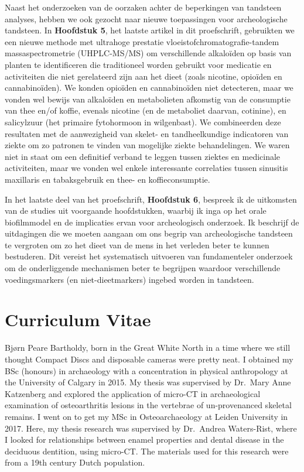 \documentclass[
  b5paper,
]{book}
\begin{document}
Naast het onderzoeken van de oorzaken achter de beperkingen van
tandsteen analyses, hebben we ook gezocht naar nieuwe toepassingen voor
archeologische tandsteen. In \textbf{Hoofdstuk 5}, het laatste artikel
in dit proefschrift, gebruikten we een nieuwe methode met ultrahoge
prestatie vloeistofchromatografie-tandem massaspectrometrie
(UHPLC-MS/MS) om verschillende alkaloïden op basis van planten te
identificeren die traditioneel worden gebruikt voor medicatie en
activiteiten die niet gerelateerd zijn aan het dieet (zoals nicotine,
opioïden en cannabinoïden). We konden opioïden en cannabinoïden niet
detecteren, maar we vonden wel bewijs van alkaloïden en metabolieten
afkomstig van de consumptie van thee en/of koffie, evenals nicotine (en
de metaboliet daarvan, cotinine), en salicylzuur (het primaire
fytohormoon in wilgenbast). We combineerden deze resultaten met de
aanwezigheid van skelet- en tandheelkundige indicatoren van ziekte om zo
patronen te vinden van mogelijke ziekte behandelingen. We waren niet in
staat om een definitief verband te leggen tussen ziektes en medicinale
activiteiten, maar we vonden wel enkele interessante correlaties tussen
sinusitis maxillaris en tabaksgebruik en thee- en koffieconsumptie.

In het laatste deel van het proefschrift, \textbf{Hoofdstuk 6}, bespreek
ik de uitkomsten van de studies uit voorgaande hoofdstukken, waarbij ik
inga op het orale biofilmmodel en de implicaties ervan voor
archeologisch onderzoek. Ik beschrijf de uitdagingen die we moeten
aangaan om ons begrip van archeologische tandsteen te vergroten om zo
het dieet van de mens in het verleden beter te kunnen bestuderen. Dit
vereist het systematisch uitvoeren van fundamenteler onderzoek om de
onderliggende mechanismen beter te begrijpen waardoor verschillende
voedingsmarkers (en niet-dieetmarkers) ingebed worden in tandsteen.

\label{curriculum-vitae}

\chapter*{Curriculum Vitae}


Bjørn Peare Bartholdy, born in the Great White North in a time where we
still thought Compact Discs and disposable cameras were pretty neat. I
obtained my BSc (honours) in archaeology with a concentration in
physical anthropology at the University of Calgary in 2015. My thesis
was supervised by Dr.~Mary Anne Katzenberg and explored the application
of micro-CT in archaeological examination of osteoarthritis lesions in
the vertebrae of un-provenanced skeletal remains. I went on to get my
MSc in Osteoarchaeology at Leiden University in 2017. Here, my thesis
research was supervised by Dr.~Andrea Waters-Rist, where I looked for
relationships between enamel properties and dental disease in the
deciduous dentition, using micro-CT. The materials used for this
research were from a 19th century Dutch population.
\end{document}
